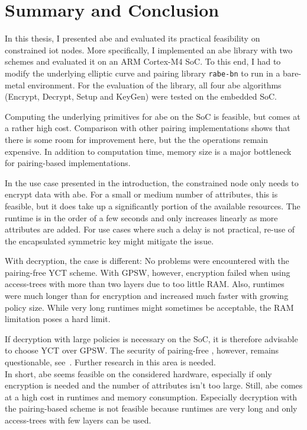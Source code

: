 \chapter{Summary and Conclusion}

In this thesis, I presented \acrlong{abe} and evaluated its practical feasibility on constrained \acrshort{iot} nodes.
More specifically, I implemented an \acrfull{abe} library with two schemes and evaluated it on an ARM Cortex-M4 SoC.
To this end, I had to modify the underlying elliptic curve and pairing library \texttt{rabe-bn} to run in a bare-metal environment.
For the evaluation of the library, all four \acrshort{abe} algorithms (Encrypt, Decrypt, Setup and KeyGen) were tested on the embedded SoC.

Computing the underlying primitives for \acrshort{abe} on the SoC is feasible, but comes at a rather high cost.
Comparison with other pairing implementations shows that there is some room for improvement here, but the the operations remain expensive.
In addition to computation time, memory size is a major bottleneck for pairing-based implementations.

In the use case presented in the introduction, the constrained node only needs to encrypt data with \acrshort{abe}.
For a small or medium number of attributes, this is feasible, but it does take up a significantly portion of the available resources.
The runtime is in the order of a few seconds and only increases linearly as more attributes are added.
For use cases where such a delay is not practical, re-use of the encapsulated symmetric key might mitigate the issue.

With decryption, the case is different: 
No problems were encountered with the pairing-free YCT scheme.
With GPSW, however, encryption failed when using \glspl{access-tree} with more than two layers due to too little RAM.
Also, runtimes were much longer than for encryption and increased much faster with growing policy size.
While very long runtimes might sometimes be acceptable, the RAM limitation poses a hard limit.

If decryption with large policies is necessary on the SoC, it is therefore advisable to choose YCT over GPSW.
The security of pairing-free , however, remains questionable, see~\cite{herranz_attacking_2020}.
Further research in this area is needed.\\

In short, \acrfull{abe} seems feasible on the considered hardware, especially if only encryption is needed and the number of attributes isn't too large.
Still, \acrshort{abe} comes at a high cost in runtimes and memory consumption.
Especially decryption with the pairing-based scheme is not feasible because runtimes are very long and only \glspl{access-tree} with few layers can be used.